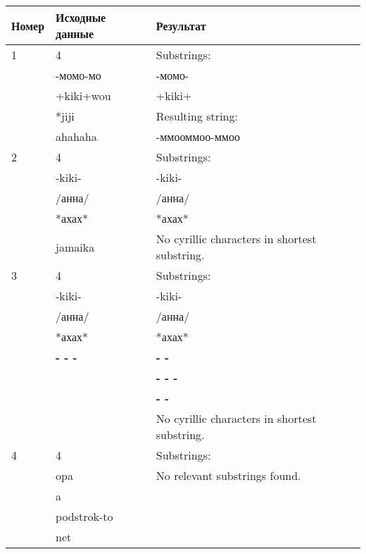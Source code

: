 \begin{table}[h]
\centering
\begin{tabular}{|l|l|l|}
    \hline
    Номер & Исходные данные & Результат\\[2ex]
    \hline
    1 & 4                    & Substrings: \\
      & -момо-мо             & -момо- \\
      & +kiki+wou            & +kiki+ \\
      & *jiji                & Resulting string: \\
      & ahahaha              & -ммооммоо-ммоо \\
    \hline
    2 & 4                    & Substrings: \\
      & -kiki-               & -kiki- \\
      & /анна/               & /анна/ \\
      & *ахах*               & *ахах* \\
      & jamaika              & No cyrillic characters in shortest substring. \\
    \hline
    3 & 4                    & Substrings: \\
      & -kiki-               & -kiki- \\
      & /анна/               & /анна/ \\
      & *ахах*               & *ахах* \\
      & \textbf{- - -}         & \textbf{- -} \\
      &                      & \textbf{- - -} \\
      &                      & \textbf{- -} \\
      &                      & No cyrillic characters in shortest substring. \\
    \hline
    4 & 4                    & Substrings: \\
      & opa                  & No relevant substrings found. \\
      & a                    & \\
      & podstrok-to          & \\
      & net                  & \\
    \hline
\end{tabular}
\end{table}